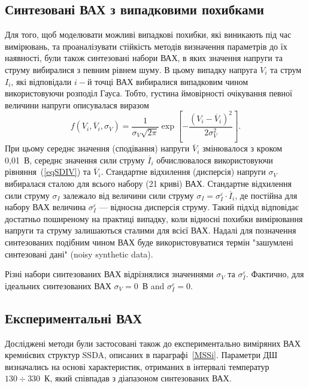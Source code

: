 \documentclass[a4paper,14pt,oneside,openany]{memoir}
\begin{document}
\subsection{Синтезовані ВАХ з випадковими похибками}
Для того, щоб моделювати можливі випадкові похибки, які виникають під час вимірювань, та проаналізувати стійкість методів визначення параметрів до їх наявності,
були також синтезовані набори ВАХ, в яких значення напруги та струму вибиралися з певним рівнем шуму.
В цьому випадку напруга $V_i$ та струм $I_i$, які відповідали $i-$й точці ВАХ вибиралися випадковим чином використовуючи розподіл Гауса.
Тобто, густина ймовірності очікування певної величини напруги описувалася виразом
\begin{equation}
\label{eqGaus}
f(V_i,\overline{V}_i,\sigma_V)=\frac{1}{\sigma_V\sqrt{2\pi}}\exp\left[-\frac{(V_i-\overline{V}_i)^2}{2\sigma_V^2}\right].
\end{equation}
При цьому середнє значення (сподівання) напруги $\overline{V}_i$ змінювалося з кроком 0,01~В,
середнє значення сили струму $\overline{I}_i$ обчислювалося використовуючи рівняння~(\ref{eqSDIV}) та $\overline{V}_i$.
Стандартне відхилення (дисперсія) напруги $\sigma_V$ вибиралася сталою для всього набору (21 криві) ВАХ.
Стандартне відхилення сили струму $\sigma_I$ залежало від величини сили струму $\sigma_I=\sigma_I^\varepsilon\cdot\overline{I}_i$,
де постійна для набору ВАХ величина $\sigma_I^\varepsilon$ --- відносна дисперсія струму.
Такий підхід відповідає достатньо поширеному на практиці випадку, коли відносні похибки вимірювання напруги та струму залишаються сталими для всієї ВАХ.
Надалі для позначення синтезованих подібним чином ВАХ буде використовуватися термін "зашумлені синтезовані дані" (noisy synthetic data).

Різні набори синтезованих ВАХ відрізнялися значеннями $\sigma_V$ та $\sigma_I^\varepsilon$.
Фактично, для ідеальних синтезованих ВАХ $\sigma_V=0$~В and $\sigma_I^\varepsilon=0$.


\subsection{Експериментальні ВАХ}
Досліджені методи були застосовані також до експериментально виміряних ВАХ кремнієвих структур SSDA, описаних в параграфі~\ref{MSSi}.
Параметри ДШ визначались на основі характеристик, отриманих в інтервалі температур $130\div330$~К, який співпадав з діапазоном синтезованих ВАХ.
\end{document}
